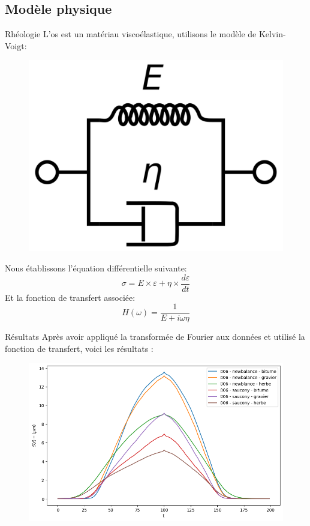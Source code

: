 \subsection{Modèle physique}
\begin{frame}{Rhéologie}
    L'os est un matériau viscoélastique, utilisons le modèle de Kelvin-Voigt:
    \begin{figure}
        \includegraphics[scale=0.1]{./figures/rheo_00.png}
    \end{figure}
    Nous établissons l'équation différentielle suivante:
    $$ \sigma = E \times \varepsilon + \eta \times \frac{d\varepsilon}{dt}$$
    Et la fonction de transfert associée:
    $$ H(\omega) = \frac{1}{E+i\omega\eta}$$
\end{frame}
\begin{frame}{Résultats}
    Après avoir appliqué la transformée de Fourier aux données et utilisé la fonction de transfert, voici les résultats :
    \begin{figure}
        \includegraphics[scale=0.5]{./figures/rheo_05.png}
    \end{figure}
\end{frame}
